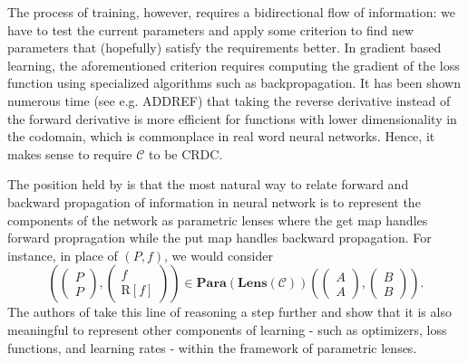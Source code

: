 \documentclass[11pt,a4paper,openright,twoside]{report}
\theoremstyle{plain}
\theoremstyle{definition}
\begin{document}
The process of training, however, requires a bidirectional flow of information: we have to test the current parameters and apply some criterion to find new parameters that (hopefully) satisfy the requirements better. In gradient based learning, the aforementioned criterion requires computing the gradient of the loss function using specialized algorithms such as backpropagation. It has been shown numerous time (see e.g. ADDREF) that taking the reverse derivative instead of the forward derivative is more efficient for functions with lower dimensionality in the codomain, which is commonplace in real word neural networks. Hence, it makes sense to require $\mathcal{C}$ to be CRDC. 

The position held by \cite{cruttwellDeepLearningParametric} is that the most natural way to relate forward and backward propagation of information in neural network is to represent the components of the network as parametric lenses where the get map handles forward propragation while the put map handles backward propagation. For instance,  in place of $(P,f)$, we would consider
\begin{equation}
  \label{eq: exparametriclens}
  \left(\begin{pmatrix} P \\ P \end{pmatrix},\begin{pmatrix} f \\ \mathrm{R}[f] \end{pmatrix}\right) 
  \in \mathbf{Para}(\mathbf{Lens}(\mathcal{C}))
  \left(\begin{pmatrix} A \\ A \end{pmatrix},\begin{pmatrix} B \\ B \end{pmatrix}\right).
\end{equation}
The authors of \cite{cruttwellDeepLearningParametric} take this line of reasoning a step further and show that it is also meaningful to represent other components of learning - such as optimizers, loss functions, and learning rates - within the framework of parametric lenses. 
\end{document}
